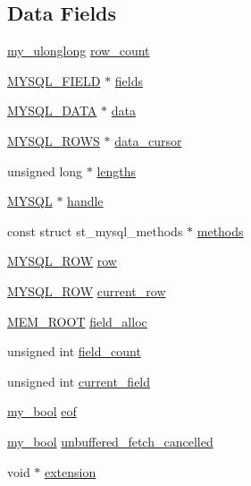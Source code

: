 \subsection*{Data Fields}
\begin{DoxyCompactItemize}
\item 
\hyperlink{mysql_8h_ae05bd5d3e5a75578e2f14cfeb43f07aa}{my\+\_\+ulonglong} \hyperlink{structst__mysql__res_aeebcaa8a317200a20bbde5d9f9f73169}{row\+\_\+count}
\item 
\hyperlink{mysql_8h_ad010774d7ae34dc28a2e044ed2cd4f71}{M\+Y\+S\+Q\+L\+\_\+\+F\+I\+E\+L\+D} $\ast$ \hyperlink{structst__mysql__res_a608224b643e0d8fc992de01230195dda}{fields}
\item 
\hyperlink{mysql_8h_a19837b8e2f5cec429a5b61d4d5c68ed6}{M\+Y\+S\+Q\+L\+\_\+\+D\+A\+T\+A} $\ast$ \hyperlink{structst__mysql__res_a213ea8e00645396f226362cdbd2880b7}{data}
\item 
\hyperlink{mysql_8h_a4d0140764825a51eae874c641df1afb5}{M\+Y\+S\+Q\+L\+\_\+\+R\+O\+W\+S} $\ast$ \hyperlink{structst__mysql__res_a874a24ee537561e5dc86e5e86a9afd9d}{data\+\_\+cursor}
\item 
unsigned long $\ast$ \hyperlink{structst__mysql__res_ac6b5b0d8456fe15d529ece8c107d7063}{lengths}
\item 
\hyperlink{mysql_8h_a42e5b5e53a1263817a59e42e219feca6}{M\+Y\+S\+Q\+L} $\ast$ \hyperlink{structst__mysql__res_ac67d314af96af560ea7880245ab5a710}{handle}
\item 
const struct st\+\_\+mysql\+\_\+methods $\ast$ \hyperlink{structst__mysql__res_a87d087d083eb50c81b30285a7b8458b1}{methods}
\item 
\hyperlink{mysql_8h_afae8ad264fb6a4bd740df59f19b9da71}{M\+Y\+S\+Q\+L\+\_\+\+R\+O\+W} \hyperlink{structst__mysql__res_a12b56773449e21072694f7749086d64a}{row}
\item 
\hyperlink{mysql_8h_afae8ad264fb6a4bd740df59f19b9da71}{M\+Y\+S\+Q\+L\+\_\+\+R\+O\+W} \hyperlink{structst__mysql__res_ae4ba04806b79944ca5c5cd46ff8b1ef2}{current\+\_\+row}
\item 
\hyperlink{my__alloc_8h_ac59e289b254a2c5ac634ffcedda3f823}{M\+E\+M\+\_\+\+R\+O\+O\+T} \hyperlink{structst__mysql__res_a76a8c7214ccdae2c8986b2f8bbc25dd2}{field\+\_\+alloc}
\item 
unsigned int \hyperlink{structst__mysql__res_a46ca3cf833b020e86e4d7f4ebe36f190}{field\+\_\+count}
\item 
unsigned int \hyperlink{structst__mysql__res_a35bcf75097f62db6990a09dcfd1d3401}{current\+\_\+field}
\item 
\hyperlink{mysql_8h_a74cd599039dcf29c6e6d342cf4efd0a8}{my\+\_\+bool} \hyperlink{structst__mysql__res_ab24839f1879e03ffa511e9bce92419e9}{eof}
\item 
\hyperlink{mysql_8h_a74cd599039dcf29c6e6d342cf4efd0a8}{my\+\_\+bool} \hyperlink{structst__mysql__res_a4fddbf81b6ead57fdfd384e74d918cfb}{unbuffered\+\_\+fetch\+\_\+cancelled}
\item 
void $\ast$ \hyperlink{structst__mysql__res_abf63f6350874811fdf3fb90c49e532dd}{extension}
\end{DoxyCompactItemize}


